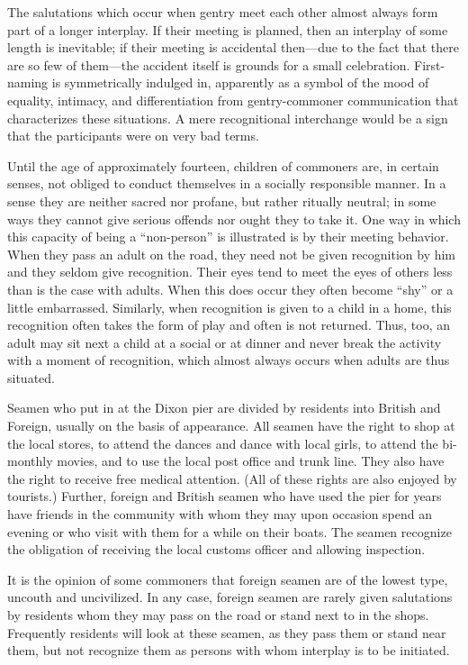 \documentclass[twoside,symmetric,nobib,justified]{tufte-book}
\begin{document}
The salutations which occur when gentry meet each other almost always
form part of a longer interplay. If their meeting is planned, then an
interplay of some length is inevitable; if their meeting is accidental
then---due to the fact that there are so few of them---the accident
itself is grounds for a small celebration. First-naming is symmetrically
indulged in, apparently as a symbol of the mood of equality, intimacy,
and differentiation from gentry-commoner communication that
characterizes these situations. A mere recognitional interchange would
be a sign that the participants were on very bad terms.

Until the age of approximately fourteen, children of commoners are, in
certain senses, not obliged to conduct themselves in a socially
responsible manner. In a sense they are neither sacred nor profane, but
rather ritually neutral; in some ways they cannot give serious offends
nor ought they to take it. One way in which this capacity of being a
``non-person'' is illustrated is by their meeting behavior. When they
pass an adult on the road, they need not be given recognition by him and
they seldom give recognition. Their eyes tend to meet the eyes of others
less than is the case with adults. When this does occur they often
become ``shy'' or a little embarrassed. Similarly, when recognition is
given to a child in a home, this recognition often takes the form of
play and often is not returned. Thus, too, an adult may sit next a child
at a social or at dinner and never break the activity with a moment of
recognition, which almost always occurs when adults are thus situated.

Seamen who put in at the Dixon pier are divided by residents into
British and Foreign, usually on the basis of appearance. All seamen have
the right to shop at the local stores, to attend the dances and dance
with local girls, to attend the bi-monthly movies, and to use the local
post office and trunk line. They also have the right to receive free
medical attention. (All of these rights are also enjoyed by tourists.)
Further, foreign and British seamen who have used the pier for years
have friends in the community with whom they may upon occasion spend an
evening or who visit with them for a while on their boats. The seamen
recognize the obligation of receiving the local customs officer and
allowing inspection.

It is the opinion of some commoners that foreign seamen are of the
lowest type, uncouth and uncivilized. In any case, foreign seamen are
rarely given salutations by residents whom they may pass on the road or
stand next to in the shops. Frequently residents will look at these
seamen, as they pass them or stand near them, but not recognize them as
persons with whom interplay is to be initiated.
\end{document}
